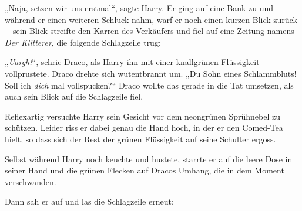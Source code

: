 „Naja, setzen wir uns erstmal“, sagte Harry. Er ging auf eine Bank zu und während er einen weiteren Schluck nahm, warf er noch einen kurzen Blick zurück—sein Blick streifte den Karren des Verkäufers und fiel auf eine Zeitung namens \emph{Der Klitterer}, die folgende Schlagzeile trug:


„\emph{Uargh!}“, schrie Draco, als Harry ihn mit einer knallgrünen Flüssigkeit vollprustete. Draco drehte sich wutentbrannt um. „Du Sohn eines Schlammbluts! Soll ich \emph{dich} mal vollspucken?“ Draco wollte das gerade in die Tat umsetzen, als auch sein Blick auf die Schlagzeile fiel.

Reflexartig versuchte Harry sein Gesicht vor dem neongrünen Sprühnebel zu schützen. Leider riss er dabei genau die Hand hoch, in der er den Comed-Tea hielt, so dass sich der Rest der grünen Flüssigkeit auf seine Schulter ergoss.

Selbst während Harry noch keuchte und hustete, starrte er auf die leere Dose in seiner Hand und die grünen Flecken auf Dracos Umhang, die in dem Moment verschwanden.

Dann sah er auf und las die Schlagzeile erneut:


